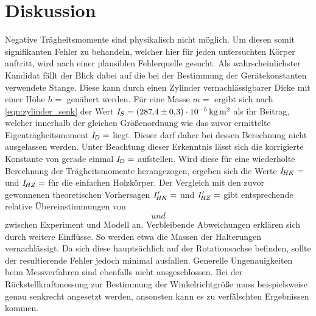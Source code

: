 \section{Diskussion}
\label{sec:diskussion}

Negative Trägheitsmomente sind physikalisch nicht möglich. Um diesen somit signifikanten Fehler zu behandeln,
welcher hier für jeden untersuchten Körper auftritt, wird nach einer plausiblen Fehlerquelle gesucht. Als wahrscheinlichster
Kandidat fällt der Blick dabei auf die bei der Bestimmung der Gerätekonstanten verwendete Stange. Diese kann durch einen
Zylinder vernachlässigbarer Dicke mit einer Höhe $h = $ genähert werden. Für eine Masse
$m = $ ergibt sich nach \eqref{eqn:zylinder_senk} der Wert \mbox{$I_{\hspace{-0.15ex}S} =
(287\hspace{-0.15ex},\hspace{-0.3ex}4 \pm 0,\hspace{-0.3ex}3) \cdot\qty{e-5}{\kilo\gram\meter\squared}$}
als ihr Beitrag, welcher innerhalb der gleichen Größenordnung wie das zuvor ermittelte Eigenträgheitsmoment
$I_{\hspace{-0.3ex}D} = $ liegt. Dieser darf daher bei dessen Berechnung nicht ausgelassen werden.
Unter Beachtung dieser Erkenntnis lässt sich die korrigierte Konstante von gerade einmal
$I_{\hspace{-0.3ex}D} = $ aufstellen. Wird diese für eine wiederholte Berechnung
der Trägheitsmomente herangezogen, ergeben sich die Werte
$I_{\hspace{-0.3ex}H\hspace{-0.15ex}K} = $ und
$I_{\hspace{-0.3ex}H\hspace{-0.15ex}Z} = $ für die einfachen Holzkörper.
Der Vergleich mit den zuvor gewonnenen theoretischen Vorhersagen
$I'_{\hspace{-0.3ex}H\hspace{-0.15ex}K} = $ und
$I'_{\hspace{-0.3ex}H\hspace{-0.15ex}Z} = $ gibt entsprechende relative Übereinstimmungen
von $$ und $$ zwischen Experiment und Modell an.
Verbleibende Abweichungen erklären sich durch weitere Einflüsse. So werden etwa die Massen der Halterungen
vernachlässigt. Da sich diese hauptsächlich auf der Rotationsachse befinden, sollte der resultierende Fehler jedoch minimal
ausfallen. Generelle Ungenauigkeiten beim Messverfahren sind ebenfalls nicht ausgeschlossen. Bei der Rückstellkraftmessung
zur Bestimmung der Winkelrichtgröße muss beispielsweise genau senkrecht angesetzt werden, ansonsten kann es zu verfälschten
Ergebnissen kommen.


